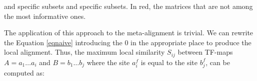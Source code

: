 \begin{table}[t!]
\begin{center}
\begin{minipage}{0.98\linewidth}\setlength{\parindent}{0pt}
\begin{center}
\end{center}
\end{minipage}
          { and  specific subsets}%
          { and  specific subsets.}%
          {In red, the matrices that are not among the most informative ones.}
\end{center}
\end{table}

The application of this approach to the meta-alignment is trivial. We can rewrite the
Equation \ref{eqnaive} introducing the $0$ in the appropriate place to produce the local alignment.
Thus, the maximum local similarity $S_{ij}$ between TF-maps  $A = a_1 \ldots a_i$ and 
$B = b_1 \ldots b_j$ where the site $a_i^f$ is equal to the site $b_j^f$, 
can be computed as: 

